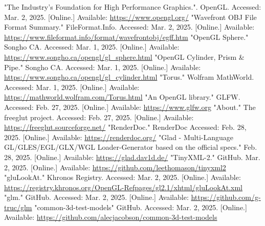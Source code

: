 \documentclass[12pt, a4paper]{article}
\begin{document}
\begin{thebibliography}{9}
        "The Industry's Foundation for High Performance Graphics."{}. OpenGL. Accessed:
        Mar. 2, 2025. [Online.] Available: \url{https://www.opengl.org/}
        "Wavefront OBJ File Format Summary."{} FileFormat.Info. Accessed: Mar. 2, 2025. [Online.]
        Available: \url{https://www.fileformat.info/format/wavefrontobj/egff.htm}
        "OpenGL Sphere."{} Songho CA. Accessed: Mar. 1, 2025. [Online.] Available:
        \url{https://www.songho.ca/opengl/gl_sphere.html}
        "OpenGL Cylinder, Prism \& Pipe."{} Songho CA. Accessed: Mar. 1, 2025. [Online.] Available:
        \url{https://www.songho.ca/opengl/gl_cylinder.html}
        "Torus."{} Wolfram MathWorld. Accessed: Mar. 1, 2025. [Online.] Available:
        \url{https://mathworld.wolfram.com/Torus.html}
        "An OpenGL library."{} GLFW. Accessed: Feb. 27, 2025. [Online.] Available:
        \url{https://www.glfw.org}
        "About."{} The freeglut project. Accessed: Feb. 27, 2025. [Online.] Available:
        \url{https://freeglut.sourceforge.net/}
        "RenderDoc."{} RenderDoc Accessed: Feb. 28, 2025. [Online.] Available:
        \url{https://renderdoc.org/}
        "Glad - Multi-Language GL/GLES/EGL/GLX/WGL Loader-Generator based on the official specs."{}
        Feb. 28, 2025. [Online.] Available: \url{https://glad.dav1d.de/}
        "TinyXML-2."{} GitHub. Mar. 2, 2025. [Online.] Available:
        \url{https://github.com/leethomason/tinyxml2}
        "gluLookAt."{} Khronos Registry. Accessed: Mar. 2, 2025. [Online.] Available:
        \url{https://registry.khronos.org/OpenGL-Refpages/gl2.1/xhtml/gluLookAt.xml}
        "glm."{} GitHub. Accessed: Mar. 2, 2025. [Online.] Available:
        \url{https://github.com/g-truc/glm}
        "common-3d-test-models"{} GitHub. Accessed: Mar. 2, 2025. [Online.] Available:
        \url{https://github.com/alecjacobson/common-3d-test-models}
\end{thebibliography}
\endgroup
\end{document}
